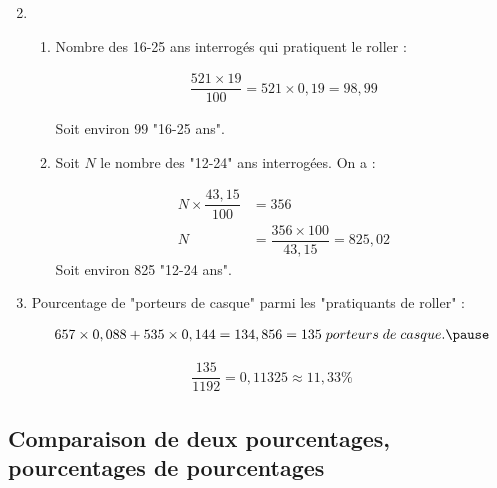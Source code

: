 \documentclass[xcolor={dvipsnames}]{beamer}
\begin{document}
\begin{frame}{}

\begin{enumerate}%
	\setcounter{enumi}{1}
	\item 
	\begin{enumerate} [a]
		\item Nombre des 16-25 ans interrogés qui pratiquent le roller :\pause
		
		\begin{eqnarray*}
			\dfrac{521 \times 19}{100} = 521 \times 0,19 = 98,99
		\end{eqnarray*}
		
		Soit environ 99 "16-25 ans".\pause
		
		
		\item Soit $N$ le nombre des "12-24" ans interrogées. On a :\pause
		
		\begin{eqnarray*}
			N \times \dfrac{43,15}{100} &= 356 \\
			N &= \dfrac{356 \times 100}{43,15} = 825,02
		\end{eqnarray*}
		Soit environ 825 "12-24 ans".
	\end{enumerate}
\end{enumerate}
\end{frame}

\begin{frame}{}

\begin{enumerate}%
	\setcounter{enumi}{2}
	\item Pourcentage de "porteurs de casque" parmi les "pratiquants de roller" :\pause
	
	\begin{eqnarray*}
		657 \times 0,088 + 535 \times 0,144 = 134,856 = 135\; porteurs\; de\; casque. \pause
	\end{eqnarray*}
	
	\begin{eqnarray*}
		\dfrac{135}{1192}=0,11325 \approx 11,33 \%
	\end{eqnarray*}
	
\end{enumerate}

\end{frame}


\subsection{Comparaison de deux pourcentages, pourcentages de pourcentages}
\end{document}

